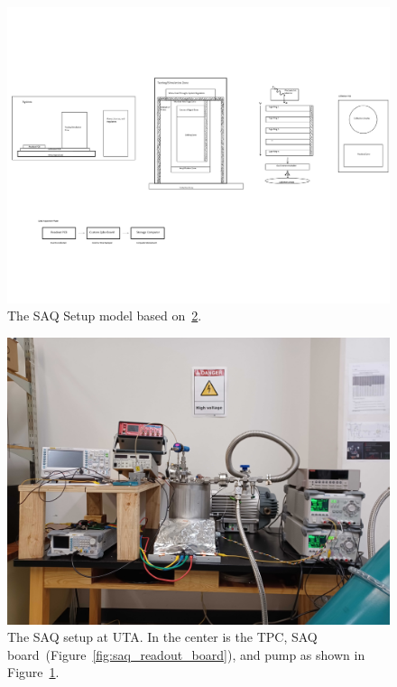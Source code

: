 \begin{figure}[]
\centering
\includegraphics[width=\textwidth]{images/SAQ_setup_diagram.pdf}
\caption{The SAQ Setup model based on~\ref{fig:saq_setup_flatten}.}
\label{fig:saq_physical_setup_flatten}
\end{figure}


\begin{figure}[]
\centering
\includegraphics[width=\textwidth]{images/SAQ_physical_setup.jpg}
\caption{The SAQ setup at UTA.
In the center is the TPC, SAQ board~(Figure~\ref{fig:saq_readout_board}), and pump as shown in Figure~\ref{fig:saq_physical_setup_flatten}.
}
\label{fig:saq_setup_flatten}
\end{figure}


